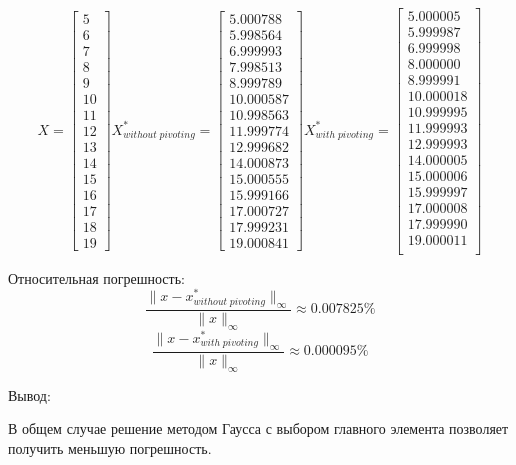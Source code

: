 \documentclass[a4paper, 12pt]{article}
\begin{document}
\[
X = \left[{\begin{array}{r}
	5 \\
	6 \\
	7 \\
	8 \\
	9 \\
	10 \\
	11 \\
	12 \\
	13 \\
	14 \\
	15 \\
	16 \\
	17 \\
	18 \\
	19
	\end{array}}\right]
X^*_{without\;pivoting} = \left[{\begin{array}{r}
	5.000788 \\
	5.998564 \\
	6.999993 \\
	7.998513 \\
	8.999789 \\
	10.000587 \\
	10.998563 \\
	11.999774 \\
	12.999682 \\ 
	14.000873 \\
	15.000555 \\ 
	15.999166 \\ 
	17.000727 \\
	17.999231 \\
	19.000841
	\end{array}}\right]
X^*_{with\;pivoting} = \left[{
	\begin{array}{r}
    5.000005 \\
	5.999987 \\
	6.999998 \\
	8.000000 \\
	8.999991 \\
	10.000018 \\
	10.999995 \\
	11.999993 \\
	12.999993 \\
	14.000005 \\
	15.000006 \\
	15.999997 \\
	17.000008 \\
	17.999990 \\
	19.000011 \\
	\end{array}}\right]
\]

\normalsize
Относительная погрешность:
\[
\frac{\|x - x^*_{without\;pivoting}\|_{\infty}}{\|x\|_{\infty}} \approx 0.007825\%
\]
\[
\frac{\|x - x^*_{with\;pivoting}\|_{\infty}}{\|x\|_{\infty}} \approx 0.000095\%
\]

Вывод:

В общем случае решение методом Гаусса с выбором главного элемента позволяет получить меньшую погрешность.
\end{document}
